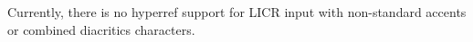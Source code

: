 \documentclass{article}
\begin{document}
Currently, there is no hyperref support for LICR input with non-standard
accents or combined diacritics characters.

\subsection{}
\subsection{}
\subsection{}
\subsection{}
\subsection{}
\end{document}

